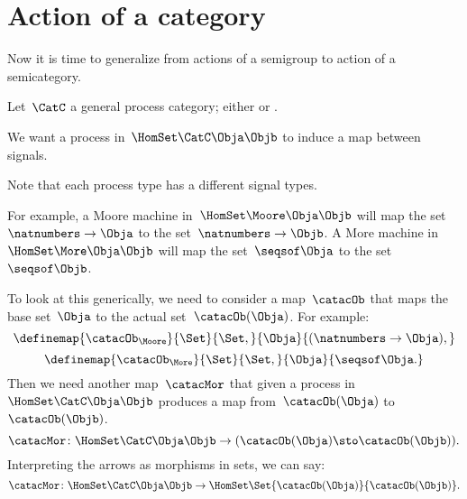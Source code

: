 \section{Action of a category}




Now it is time to generalize from actions of a semigroup to action of a semicategory.

Let~$\CatC$ a general process category; either \Moore or \More. %

We want a process in~$\HomSet\CatC\Obja\Objb$ to induce a map between signals.

Note that each process type has a different signal types.

For example, a Moore machine in~$\HomSet\Moore\Obja\Objb$ will map the set~$\natnumbers \to \Obja$ to the set~$\natnumbers \to \Objb$.
A More machine in~$\HomSet\More\Obja\Objb$  will map the set~$\seqsof \Obja$ to the set~$\seqsof \Objb$.

To look at this generically, we need to consider a map~$\catacOb$ that maps the base set~$\Obja$ to the actual set~$\catacOb(\Obja)$.
For example:
%
\begin{equation}
    \definemap{\catacOb_{\Moore}}{\Set}{\Set,}{\Obja}{(\natnumbers \to \Obja),}
\end{equation}
%
\begin{equation}
    \definemap{\catacOb_{\More}}{\Set}{\Set,}{\Obja}{\seqsof \Obja.}
\end{equation}
%
Then we need another map~$\catacMor$ that given a process in~$\HomSet\CatC\Obja\Objb$ produces a map from~$\catacOb(\Obja)$ to~$\catacOb(\Objb)$.
%
\begin{equation}
    \label{eq:gamma-1}
    \catacMor\colon \HomSet\CatC\Obja\Objb \to  (\catacOb(\Obja) \sto \catacOb(\Objb)).
\end{equation}
%
Interpreting the arrows as morphisms in sets, we can say:
%
\begin{equation}
    \label{eq:gamma-2}
    \catacMor\colon \HomSet\CatC\Obja\Objb \to  \HomSet\Set{\catacOb(\Obja)}{\catacOb(\Objb) }.
\end{equation}


